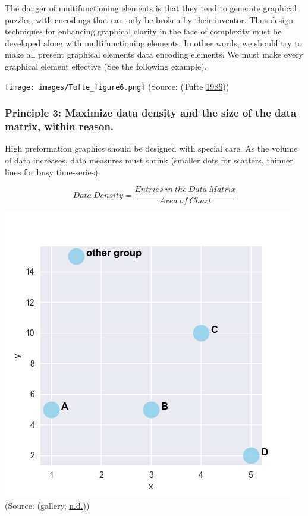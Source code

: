 \documentclass[]{book}
\begin{document}
The danger of multifunctioning elements is that they tend to generate graphical puzzles, with encodings that can only be broken by their inventor. Thus design techniques for enhancing graphical clarity in the face of complexity must be developed along with multifunctioning elements. In other words, we should try to make all present graphical elements data encoding elements. We must make every graphical element effective (See the following example).

\texttt{[image: images/Tufte\_figure6.png]}
(Source: (Tufte \protect\hyperlink{ref-The-Visual-Display-of-Quantitative-Information}{1986}))

\hypertarget{principle-3-maximize-data-density-and-the-size-of-the-data-matrix-within-reason.}{%
\subsubsection{Principle 3: Maximize data density and the size of the data matrix, within reason.}\label{principle-3-maximize-data-density-and-the-size-of-the-data-matrix-within-reason.}}

High preformation graphics should be designed with special care. As the volume of data increases, data measures must shrink (smaller dots for scatters, thinner lines for busy time-series).

\[{Data \ Density} = \frac{{Entries \ in \ the \ Data \ Matrix}}{{Area \ of \ Chart}}\]

\includegraphics{images/scatterplot_bigdot.png}
(Source: (gallery, \protect\hyperlink{ref-The_python_graph_gallery_scatter_plot}{n.d.}))
\end{document}
